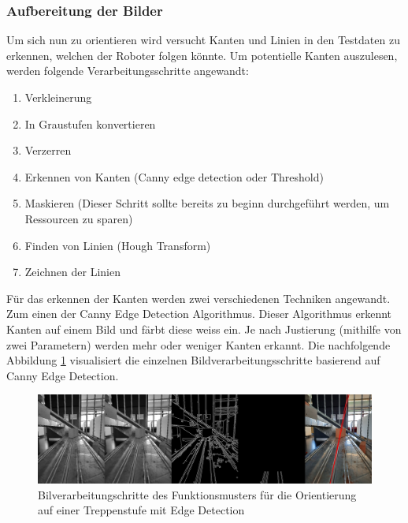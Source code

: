 \subsubsection*{Aufbereitung der Bilder}
\label{sec:aufbereitung-der-bilder}
Um sich nun zu orientieren wird versucht Kanten und Linien in den Testdaten zu erkennen, welchen der Roboter folgen könnte. Um potentielle Kanten auszulesen, werden folgende Verarbeitungsschritte angewandt:
\begin{enumerate}
    \item Verkleinerung
    \item In Graustufen konvertieren
    \item Verzerren
    \item Erkennen von Kanten (Canny edge detection oder Threshold)
    \item Maskieren (Dieser Schritt sollte bereits zu beginn durchgeführt werden, um Ressourcen zu sparen)
    \item Finden von Linien (Hough Transform)
    \item Zeichnen der Linien
\end{enumerate}
Für das erkennen der Kanten werden zwei verschiedenen Techniken angewandt. Zum einen der Canny Edge Detection Algorithmus\cite{OpenCV-Canny}. Dieser Algorithmus erkennt Kanten auf einem Bild und färbt diese weiss ein. Je nach Justierung (mithilfe von zwei Parametern) werden mehr oder weniger Kanten erkannt. Die nachfolgende Abbildung \ref{fig:bildverarbeitungsschritte-canny-edge} visualisiert die einzelnen Bildverarbeitungsschritte basierend auf Canny Edge Detection.
\begin{figure}[H]
  \includegraphics[width=1.0\textwidth]{img/orientierung-treppenstufe/collageCanny.jpg}
  \centering
  \caption{Bilverarbeitungschritte des Funktionsmusters für die Orientierung auf einer Treppenstufe mit Edge Detection}
  \label{fig:bildverarbeitungsschritte-canny-edge}
\end{figure}
  
